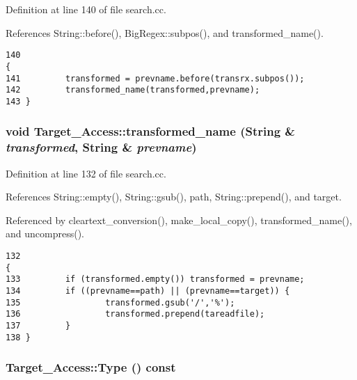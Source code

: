 Definition at line 140 of file search.cc.

References String::before(), Big\-Regex::subpos(), and transformed\_\-name().



\footnotesize\begin{verbatim}140                                                                                                       {
141         transformed = prevname.before(transrx.subpos());
142         transformed_name(transformed,prevname);
143 }
\end{verbatim}\normalsize 
{}
\subsubsection{\setlength{\rightskip}{0pt plus 5cm}void Target\_\-Access::transformed\_\-name ({\bf String} \& {\em transformed}, {\bf String} \& {\em prevname})\hspace{0.3cm}{\tt  [protected]}}\label{classTarget__Access_b3}




Definition at line 132 of file search.cc.

References String::empty(), String::gsub(), path, String::prepend(), and target.

Referenced by cleartext\_\-conversion(), make\_\-local\_\-copy(), transformed\_\-name(), and uncompress().



\footnotesize\begin{verbatim}132                                                                             {
133         if (transformed.empty()) transformed = prevname;
134         if ((prevname==path) || (prevname==target)) {
135                 transformed.gsub('/','%');
136                 transformed.prepend(tareadfile);
137         }
138 }
\end{verbatim}\normalsize 
{}
\subsubsection{ Target\_\-Access::Type () const\hspace{0.3cm}{\tt  [inline]}}\label{classTarget__Access_a16}





